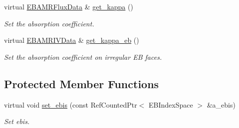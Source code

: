 \begin{DoxyCompactItemize}
virtual \hyperlink{type__definitions_8H_aadad278b2e5d3d4abcf9032f90ba78c3}{E\+B\+A\+M\+R\+Flux\+Data} \& \hyperlink{classrte__solver_a85322c6f79f48e329c758d7b6ec1cbe2}{get\+\_\+kappa} ()
\begin{DoxyCompactList}\small\item\em Set the absorption coefficient. \end{DoxyCompactList}\item 
virtual \hyperlink{type__definitions_8H_a6b8fa905d55cbb491b52180386f0e0c1}{E\+B\+A\+M\+R\+I\+V\+Data} \& \hyperlink{classrte__solver_a964bd4e647d0222c2b4d101c51bea088}{get\+\_\+kappa\+\_\+eb} ()
\begin{DoxyCompactList}\small\item\em Set the absorption coefficient on irregular EB faces. \end{DoxyCompactList}\end{DoxyCompactItemize}
\subsection*{Protected Member Functions}
\begin{DoxyCompactItemize}
\item 
virtual void \hyperlink{classrte__solver_a6ac3a2da294f7c2af1970a3a0ac113c8}{set\+\_\+ebis} (const Ref\+Counted\+Ptr$<$ E\+B\+Index\+Space $>$ \&a\+\_\+ebis)
\begin{DoxyCompactList}\small\item\em Set ebis. \end{DoxyCompactList}\end{DoxyCompactItemize}
